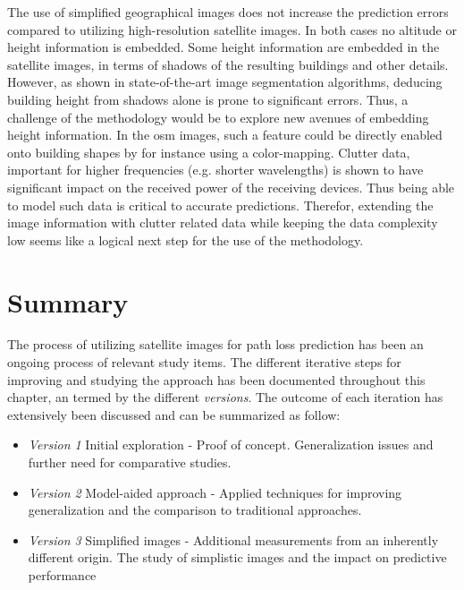 The use of simplified geographical images does not increase the prediction errors compared to utilizing high-resolution satellite images. In both cases no altitude or height information is embedded. Some height information are embedded in the satellite images, in terms of shadows of the resulting buildings and other details. However, as shown in state-of-the-art image segmentation algorithms, deducing building height from shadows alone is prone to significant errors. Thus, a challenge of the methodology would be to explore new avenues of embedding height information. In the \gls{osm} images, such a feature could be directly enabled onto building shapes by for instance using a color-mapping. Clutter data, important for higher frequencies (e.g. shorter wavelengths) is shown to have significant impact on the received power of the receiving devices. Thus being able to model such data is critical to accurate predictions. Therefor, extending the image information with clutter related data while keeping the data complexity low seems like a logical next step for the use of the methodology.


\section{Summary}\label{sec:satellite_image_discussion}
The process of utilizing satellite images for path loss prediction has been an ongoing process of relevant study items. The different iterative steps for improving and studying the approach has been documented throughout this chapter, an termed by the different \emph{versions}. The outcome of each iteration has extensively been discussed and can be summarized as follow:
\begin{itemize}
    \item \emph{Version 1} Initial exploration - Proof of concept. Generalization issues and further need for comparative studies.
    \item \emph{Version 2} Model-aided approach - Applied techniques for improving generalization and the comparison to traditional approaches.
    \item \emph{Version 3} Simplified images - Additional measurements from an inherently different origin. The study of simplistic images and the impact on predictive performance
\end{itemize}

\vspace{1em}

\vspace{1em}

